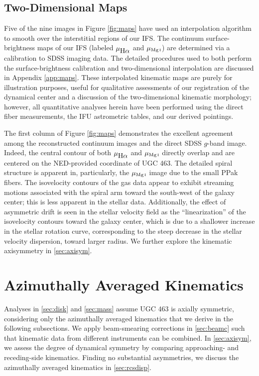 \documentclass[apj,iop,numberedappendix]{emulateapj}
\begin{document}
\subsection{Two-Dimensional Maps}
\label{sec:maps}

Five of the nine images in Figure \ref{fig:maps} have used an interpolation
algorithm to smooth over the interstitial regions of our IFS.  The continuum
surface-brightness maps of our IFS (labeled $\mu_{\mbox{H$\alpha$}}$ and $\mu_{\mbox{\scriptsize Mg{\scshape$~\!$i}}}$) are determined
via a calibration to SDSS imaging data.  The detailed procedures used to both
perform the surface-brightness calibration and two-dimensional interpolation are
discussed in Appendix \ref{app:maps}.  These interpolated kinematic maps are
purely for illustration purposes, useful for qualitative assessments of our
registration of the dynamical center and a discussion of the two-dimensional
kinematic morphology; however, all quantitative analyses herein have been
performed using the direct fiber measurements, the IFU astrometric tables, and
our derived pointings.

The first column of Figure \ref{fig:maps} demonstrates the excellent agreement
among the reconstructed continuum images and the direct SDSS $g$-band image.
Indeed, the central contour of both $\mu_{\mbox{H$\alpha$}}$ and $\mu_{\mbox{\scriptsize Mg{\scshape$~\!$i}}}$ directly overlap and are
centered on the NED-provided coordinate of UGC 463. The detailed spiral
structure is apparent in, particularly, the $\mu_{\mbox{\scriptsize Mg{\scshape$~\!$i}}}$ image due to the small PPak
fibers.  The isovelocity contours of the gas data appear to exhibit streaming
motions associated with the spiral arm toward the south-west of the galaxy
center; this is less apparent in the stellar data.  Additionally, the effect of
asymmetric drift is seen in the stellar velocity field as the ``linearization''
of the isovelocity contours toward the galaxy center, which is due to a
shallower increase in the stellar rotation curve, corresponding to the steep
decrease in the stellar velocity dispersion, toward larger radius.  We further
explore the kinematic axisymmetry in \sect \ref{sec:axisym}.

\section{Azimuthally Averaged Kinematics}
\label{sec:spk+ppk}

Analyses in \sects \ref{sec:disk} and \ref{sec:mass} assume UGC 463 is axially
symmetric, considering only the azimuthally averaged kinematics that we derive
in the following subsections.  We apply beam-smearing corrections in \sect
\ref{sec:beamc} \citep[beam-smearing corrections for the \hone\ data are
described by][]{TPKMPhD} such that kinematic data from different
instruments can be combined.  In \sect \ref{sec:axisym}, we assess the degree of
dynamical symmetry by comparing approaching- and receding-side kinematics.
Finding no substantial asymmetries, we discuss the azimuthally averaged
kinematics in \sect \ref{sec:rcsdisp}.
\end{document}
